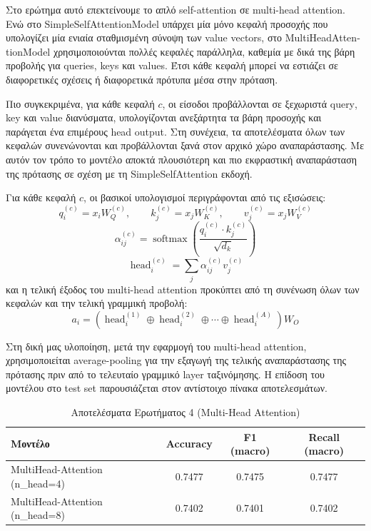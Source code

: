 \documentclass[11pt,a4paper]{article}
\begin{document}
Στο ερώτημα αυτό επεκτείνουμε το απλό \textlatin{self-attention} σε \textlatin{multi-head attention}. Ενώ στο \textlatin{SimpleSelfAttentionModel} 
υπάρχει μία μόνο κεφαλή προσοχής που υπολογίζει μία ενιαία σταθμισμένη σύνοψη των \textlatin{value vectors}, στο \textlatin{MultiHeadAttentionModel} 
χρησιμοποιούνται πολλές κεφαλές παράλληλα, καθεμία με δικά της βάρη προβολής για \textlatin{queries}, \textlatin{keys} και \textlatin{values}. Έτσι κάθε 
κεφαλή μπορεί να εστιάζει σε διαφορετικές σχέσεις ή διαφορετικά πρότυπα μέσα στην πρόταση.

Πιο συγκεκριμένα, για κάθε κεφαλή \(c\), οι είσοδοι προβάλλονται σε ξεχωριστά \textlatin{query}, \textlatin{key} και \textlatin{value} διανύσματα, 
υπολογίζονται ανεξάρτητα τα βάρη προσοχής και παράγεται ένα επιμέρους \textlatin{head output}. Στη συνέχεια, τα αποτελέσματα όλων των κεφαλών 
συνενώνονται και προβάλλονται ξανά στον αρχικό χώρο αναπαράστασης. Με αυτόν τον τρόπο το μοντέλο αποκτά πλουσιότερη και πιο εκφραστική αναπαράσταση 
της πρότασης σε σχέση με τη \textlatin{SimpleSelfAttention} εκδοχή.

Για κάθε κεφαλή \(c\), οι βασικοί υπολογισμοί περιγράφονται από τις εξισώσεις:
\[
q_i^{(c)} = x_i W_Q^{(c)},\qquad k_j^{(c)} = x_j W_K^{(c)},\qquad v_j^{(c)} = x_j W_V^{(c)}
\]
\[
\alpha_{ij}^{(c)} = \operatorname{softmax}\left(\frac{q_i^{(c)} \cdot k_j^{(c)}}{\sqrt{d_k}}\right)
\]
\[
\operatorname{head}_i^{(c)} = \sum_{j} \alpha_{ij}^{(c)} v_j^{(c)}
\]
και η τελική έξοδος του \textlatin{multi-head attention} προκύπτει από τη συνένωση όλων των κεφαλών και την τελική γραμμική προβολή:
\[
a_i = \left(\operatorname{head}_i^{(1)} \oplus \operatorname{head}_i^{(2)} \oplus \cdots \oplus \operatorname{head}_i^{(A)}\right) W_O
\]

Στη δική μας υλοποίηση, μετά την εφαρμογή του \textlatin{multi-head attention}, χρησιμοποιείται \textlatin{average-pooling} για την εξαγωγή της 
τελικής αναπαράστασης της πρότασης πριν από το τελευταίο γραμμικό \textlatin{layer} ταξινόμησης. Η επίδοση του μοντέλου στο \textlatin{test set} 
παρουσιάζεται στον αντίστοιχο πίνακα αποτελεσμάτων.

\begin{table}[H]
  \centering
  \caption{Αποτελέσματα Ερωτήματος 4 (\textlatin{Multi-Head Attention})}
  \begin{tabular}{lccc}
    \toprule
    \textbf{Μοντέλο} & \textbf{\textlatin{Accuracy}} & \textbf{\textlatin{F1 (macro)}} & \textbf{\textlatin{Recall (macro)}} \\
    \midrule
    \textlatin{MultiHead-Attention (n\_head=4)} & 0.7477 & 0.7475 & 0.7477 \\
    \textlatin{MultiHead-Attention (n\_head=8)} & 0.7402 & 0.7401 & 0.7402 \\
    \bottomrule
  \end{tabular}
\end{table}
\end{document}
